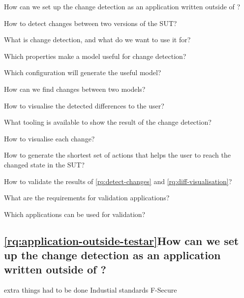 \begin{questions}

    \item How can we set up the change detection as an application written outside of \testar? \label{rq:application-outside-testar}

    \item How to detect changes between two versions of the SUT? \label{rq:detect-changes}
    \begin{questions}
        \item What is change detection, and what do we want to use it for? \label{rq:what-is-change-detection}
        \item Which properties make a model useful for change detection? \label{rq:useful-detection}
        \item Which \testar configuration will generate the useful model? \label{rq:testar-config}
        \item How can we find changes between two models? \label{rq:finding-changes}
    \end{questions}

    \item How to visualise the detected differences to the user? \label{rq:diff-visualisation}
    \begin{questions}
        \item What tooling is available to show the result of the change detection? \label{rq:tooling}
        \item How to visualise each change? \label{rq:type-visualisation}
        \item How to generate the shortest set of actions that helps the user to reach the changed state in the SUT? \label{rq:shortest-set}    
    \end{questions}
    
    \item How to validate the results of \ref{rq:detect-changes} and \ref{rq:diff-visualisation}? \label{rq:validation}
    \begin{questions}
        \item What are the requirements for validation applications? \label{rq:req-apps}
        \item Which applications can be used for validation? \label{rq:validation-apps}
    \end{questions}
\end{questions}

\subsection{\ref{rq:application-outside-testar}How can we set up the change detection as an application written outside of \testar?}
extra things had to be done
Industial standards
F-Secure


